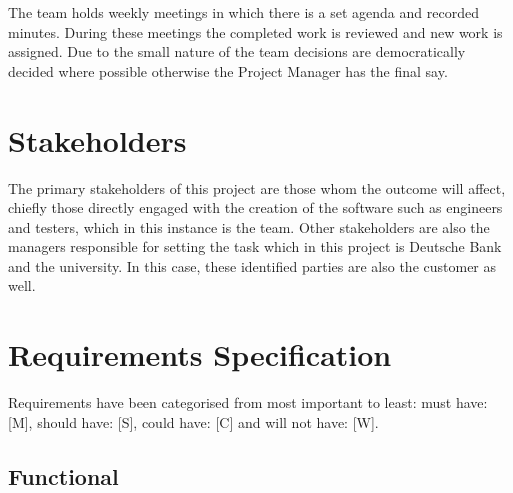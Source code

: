 \documentclass{IEEEtran}
\begin{document}
	The team holds weekly meetings in which there is a set agenda and recorded minutes. During these meetings the completed work is reviewed and new work is assigned. Due to the small nature of the team decisions are democratically decided where possible otherwise the Project Manager has the final say. 
	
	\section{Stakeholders}
	The primary stakeholders of this project are those whom the outcome will affect, chiefly those directly engaged with the creation of the software such as engineers and testers, which in this instance is the team. Other stakeholders are also the managers responsible for setting the task which in this project is Deutsche Bank and the university. In this case, these identified parties are also the customer as well.

	\section{Requirements Specification}
	Requirements have been categorised from most important to least: must have: [M], should have: [S], could have: [C] and will not have: [W].
	\subsection{Functional}
	
	\setlength{\LTpre}{0pt}
	\setlength{\LTpost}{0pt}
	
\end{document}
